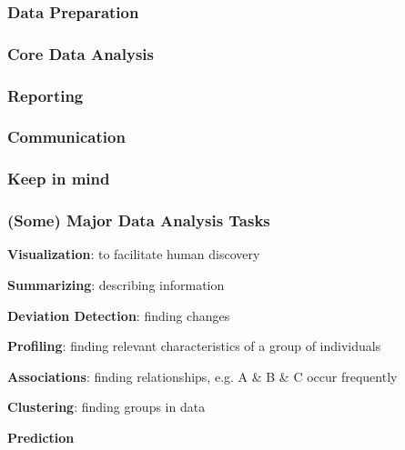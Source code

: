\documentclass[12pt]{beamer}\usepackage[]{graphicx}\usepackage[]{color}
\begin{document}

\begin{frame}
\frametitle{Data Preparation}
\begin{center}
\end{center}
\end{frame}


\begin{frame}
\frametitle{Core Data Analysis}
\begin{center}
\end{center}
\end{frame}


\begin{frame}
\frametitle{Reporting}
\begin{center}
\end{center}
\end{frame}


\begin{frame}
\frametitle{Communication}
\begin{center}
\end{center}
\end{frame}


\begin{frame}
\frametitle{Keep in mind}
\begin{center}
\end{center}
\end{frame}


\begin{frame}
\frametitle{(Some) Major Data Analysis Tasks}

\bbi
  \item \textbf{Visualization}: to facilitate human discovery
  \item \textbf{Summarizing}: describing information
  \item \textbf{Deviation Detection}: finding changes
  \item \textbf{Profiling}: finding relevant characteristics of a group of individuals
  \item \textbf{Associations}: finding relationships, e.g. A \& B \& C occur frequently
  \item \textbf{Clustering}: finding groups in data
  \pause
  \item {\large \hilit \textbf{Prediction}}
\ei

\end{frame}
\end{document}

